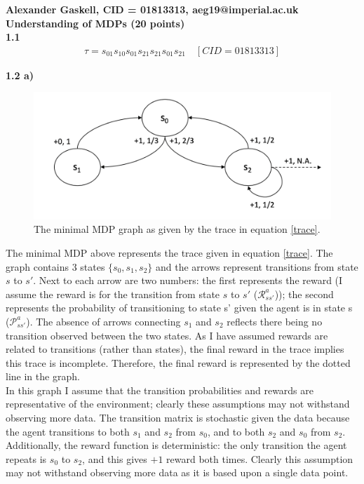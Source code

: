 \documentclass[12pt,twoside]{article}
\begin{document}
% 


\textbf{Alexander Gaskell, CID = 01813313, aeg19@imperial.ac.uk} \\

\textbf{Understanding of MDPs (20 points)} \\

\textbf{1.1}
\begin{align}
    \tau = s_01s_10s_01s_21s_21s_01s_21 \quad [CID = 01813313] \label{trace}
\end{align}

\textbf{1.2 a)}

\begin{figure}[h]
\centering %
\includegraphics[width = 0.6\hsize]{./figures/min_MDP.png}
\caption{The minimal MDP graph as given by the trace in equation \ref{trace}.} %
\label{MDP}
\end{figure}

The minimal MDP above represents the trace given in equation \ref{trace}. The graph contains 3 states $\{s_0,s_1,s_2\}$ and the arrows represent transitions from state $s$ to $s'$. Next to each arrow are two numbers: the first represents the reward (I assume the reward is for the transition from state $s$ to $s'$ ($\mathcal{R}^a_{ss'}$)); the second represents the probability of transitioning to state s' given the agent is in state s ($\mathcal{P}^a_{ss'}$). The absence of arrows connecting $s_1$ and $s_2$ reflects there being no transition observed between the two states. As I have assumed rewards are related to transitions (rather than states), the final reward in the trace implies this trace is incomplete. Therefore, the final reward is represented by the dotted line in the graph.\\

In this graph I assume that the transition probabilities and rewards are representative of the environment; clearly these assumptions may not withstand observing more data. The transition matrix is stochastic given the data because the agent transitions to both $s_1$ and $s_2$ from $s_0$, and to both $s_2$ and $s_0$ from $s_2$. Additionally, the reward function is deterministic: the only transition the agent repeats is $s_0$ to $s_2$, and this gives $+1$ reward both times. Clearly this assumption may not withstand observing more data as it is based upon a single data point. \\
\end{document}
